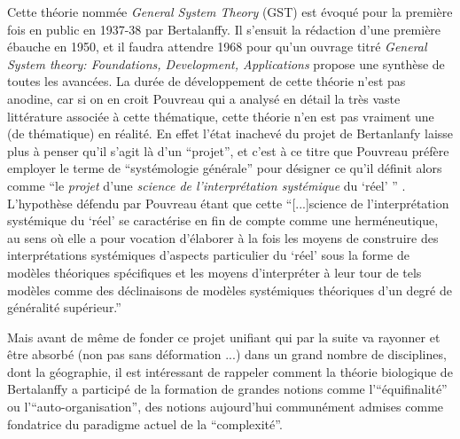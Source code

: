 Cette théorie nommée \textit{General System Theory} (GST) est évoqué pour la première fois en public en 1937-38 par Bertalanffy. Il s'ensuit la rédaction d'une première ébauche en 1950, et il faudra attendre 1968 pour qu'un ouvrage titré \textit{General System theory: Foundations, Development, Applications} propose une synthèse de toutes les avancées. La durée de développement de cette théorie n'est pas anodine, car si on en croit Pouvreau \autocite{Pouvreau2013} qui a analysé en détail la très vaste littérature associée à cette thématique, cette théorie n'en est pas vraiment une (de thématique) en réalité. En effet l'état inachevé du projet de Bertanlanfy laisse plus à penser qu'il s'agit là d'un \enquote{projet}, et c'est à ce titre que Pouvreau préfère employer le terme de \enquote{systémologie générale} pour désigner ce qu'il définit alors comme \enquote{le \textit{projet} d'une \textit{science de l'interprétation systémique} du \enquote{réel} } \autocite[9]{Pouvreau2013}. L'hypothèse défendu par Pouvreau étant que cette \enquote{[...]science de l'interprétation systémique du \enquote{réel} se caractérise en fin de compte comme une herméneutique, au sens où elle a pour vocation d'élaborer à la fois les moyens de construire des interprétations systémiques d'aspects particulier du \enquote{réel} sous la forme de modèles théoriques spécifiques et les moyens d'interpréter à leur tour de tels modèles comme des déclinaisons de modèles systémiques théoriques d'un degré de généralité supérieur.}\autocite[9-10]{Pouvreau2013}

Mais avant de même de fonder ce projet unifiant qui par la suite va rayonner et être absorbé (non pas sans déformation ...) dans un grand nombre de disciplines, dont la géographie, il est intéressant de rappeler comment la théorie biologique de Bertalanffy a participé de la formation de grandes notions comme l'\enquote{équifinalité} ou l'\enquote{auto-organisation}, des notions aujourd'hui communément admises comme fondatrice du paradigme actuel de la \enquote{complexité}.

